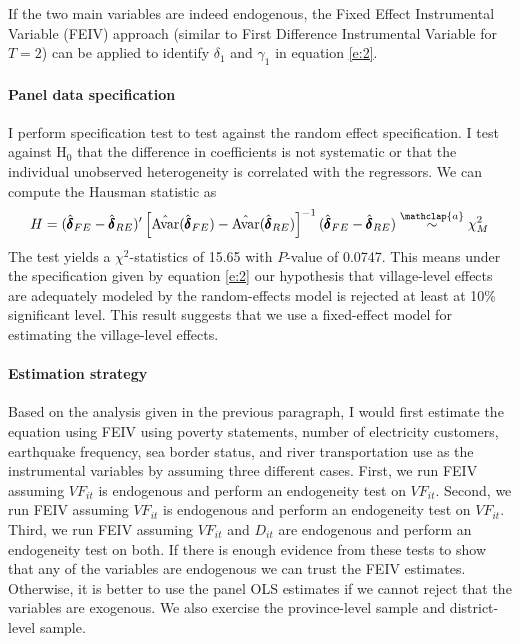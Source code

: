 \documentclass[letterpaper,12pt,leqno]{article}
\newcommand\asym{\stackrel{\mathclap{a}}{\sim}}
\newcommand{\Av}{\text{Avar}}
\newcommand{\Hy}{\text{H}}
\begin{document}
If the two main variables are indeed endogenous, the Fixed Effect Instrumental Variable (FEIV) approach (similar to First Difference Instrumental Variable for $T=2$) can be applied to identify $\delta_1$ and $\gamma_1$ in equation \eqref{e:2}.  

\paragraph{Panel data specification} I perform \citet{hausman78} specification test to test against the random effect specification. I test against $\Hy_0$ that the difference in coefficients is not systematic or that the individual unobserved heterogeneity is correlated with the regressors. We can compute the Hausman statistic as \begin{equation*}
        H=(\hat{\pmb{\delta}}_{FE}-\hat{\pmb{\delta}}_{RE})'\left[\hat{\Av}(\hat{\pmb{\delta}}_{FE})-\hat{\Av}(\hat{\pmb{\delta}}_{RE})\right]^{-1}(\hat{\pmb{\delta}}_{FE}-\hat{\pmb{\delta}}_{RE}) \asym \chi_M^2 \end{equation*}
The test yields a $\chi^2$-statistics of 15.65 with $P$-value of 0.0747. This means under the specification given by equation \eqref{e:2} our hypothesis that village-level effects are adequately modeled by the random-effects model is rejected at least at 10\% significant level. This result suggests that we use a fixed-effect model for estimating the village-level effects.

\paragraph{Estimation strategy} Based on the analysis given in the previous paragraph, I would first estimate the equation using FEIV using poverty statements, number of electricity customers, earthquake frequency, sea border status, and river transportation use as the instrumental variables by assuming three different cases. First, we run FEIV assuming $VF_{it}$ is endogenous and perform an endogeneity test on $VF_{it}$. Second, we run FEIV assuming $VF_{it}$ is endogenous and perform an endogeneity test on $VF_{it}$. Third, we run FEIV assuming $VF_{it}$ and $D_{it}$ are endogenous and perform an endogeneity test on both. If there is enough evidence from these tests to show that any of the variables are endogenous we can trust the FEIV estimates. Otherwise, it is better to use the panel OLS estimates if we cannot reject that the variables are exogenous. We also exercise the province-level sample and district-level sample.
\end{document}
